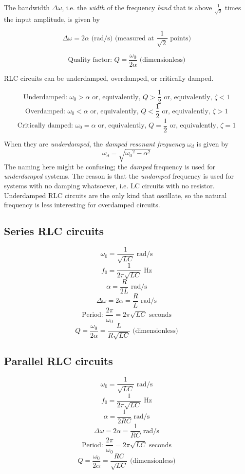 \documentclass[12pt,a4paper]{report}
\begin{document}
The bandwidth $\Delta \omega$, i.e. the \emph{width} of the frequency \emph{band} that is above $\displaystyle \frac{1}{\sqrt{2}}$ times the input amplitude, is given by

\[ \Delta \omega = 2 \alpha \text{ (rad/s) (measured at } \frac{1}{\sqrt{2}} \text{ points)} \]

\[ \text{Quality factor: } Q = \frac{\omega_0}{2\alpha} \text{ (dimensionless)} \]

RLC circuits can be underdamped, overdamped, or critically damped.

\[ \text{Underdamped: } \omega_0 > \alpha \text{ or, equivalently, } Q > \frac{1}{2} \text { or, equivalently, } \zeta < 1 \]
\[ \text{Overdamped: } \omega_0 < \alpha \text{ or, equivalently, } Q < \frac{1}{2} \text { or, equivalently, } \zeta > 1 \]
\[ \text{Critically damped: } \omega_0 = \alpha \text{ or, equivalently, } Q = \frac{1}{2} \text { or, equivalently, } \zeta = 1 \]

When they are \emph{underdamped}, the \emph{damped resonant frequency} $\omega_d$ is given by
\[ \omega_d = \sqrt{{\omega_0}^2 - \alpha^2} \]
The naming here might be confusing; the \emph{damped} frequency is used for \emph{underdamped} systems. The reason is that the \emph{undamped} frequency is used for systems with no damping whatsoever, i.e. LC circuits with no resistor.\\
Underdamped RLC circuits are the only kind that oscillate, so the natural frequency is less interesting for overdamped circuits.

\subsection{Series RLC circuits}

\[ \omega_0 = \frac{1}{\sqrt{LC}} \text{ rad/s} \]
\[ f_0 = \frac{1}{2\pi \sqrt{LC}} \text { Hz} \]
\[ \alpha = \frac{R}{2L} \text{ rad/s} \]
\[ \Delta \omega = 2\alpha = \frac{R}{L} \text { rad/s} \]
\[ \text{Period: } \frac{2\pi}{\omega_0} = 2\pi \sqrt{LC} \text { seconds} \]
\[ Q = \frac{\omega_0}{2\alpha} = \frac{L}{R\sqrt{LC}} \text { (dimensionless)} \]

\subsection{Parallel RLC circuits}

\[ \omega_0 = \frac{1}{\sqrt{LC}} \text{ rad/s} \]
\[ f_0 = \frac{1}{2\pi \sqrt{LC}} \text { Hz} \]
\[ \alpha = \frac{1}{2RC} \text{ rad/s} \]
\[ \Delta \omega = 2\alpha = \frac{1}{RC} \text { rad/s} \]
\[ \text{Period: } \frac{2\pi}{\omega_0} = 2\pi \sqrt{LC} \text { seconds} \]
\[ Q = \frac{\omega_0}{2\alpha} = \frac{RC}{\sqrt{LC}} \text { (dimensionless)} \]
\end{document}
